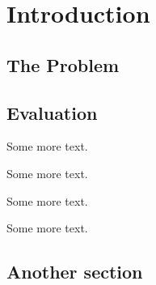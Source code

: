 \documentclass[openany]{book}
\begin{document}
\tableofcontents

\chapter{Introduction}
\thispagestyle{empty}

\lipsum

\section{The Problem}
\label{sec:problem}

\lipsum[1]

\section{Evaluation}

\lipsum

Some more text.

Some more text.

Some more text.

Some more text.


\section{Another section}

\lipsum[3]
\end{document}

